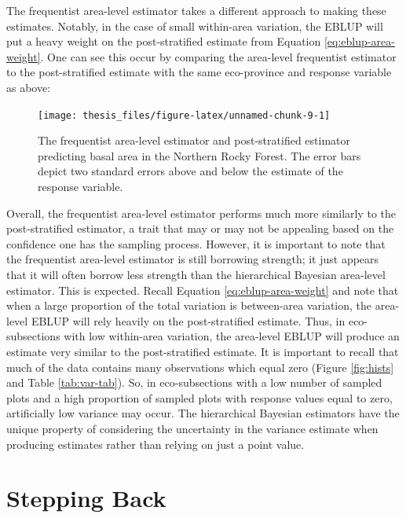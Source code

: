 \documentclass[12pt,twoside]{reedthesis}
\begin{document}
The frequentist area-level estimator takes a different approach to making these estimates. Notably, in the case of small within-area variation, the EBLUP will put a heavy weight on the post-stratified estimate from Equation \eqref{eq:eblup-area-weight}. One can see this occur by comparing the area-level frequentist estimator to the post-stratified estimate with the same eco-province and response variable as above:
\begin{figure}

{\centering \texttt{[image: thesis\_files/figure-latex/unnamed-chunk-9-1]} 

}

\caption[EBLUP area-level and Post-stratified estimates in M333]{The frequentist area-level estimator and post-stratified estimator predicting basal area in the Northern Rocky Forest. The error bars depict two standard errors above and below the estimate of the response variable.}\label{fig:unnamed-chunk-9}
\end{figure}
Overall, the frequentist area-level estimator performs much more similarly to the post-stratified estimator, a trait that may or may not be appealing based on the confidence one has the sampling process. However, it is important to note that the frequentist area-level estimator is still borrowing strength; it just appears that it will often borrow less strength than the hierarchical Bayesian area-level estimator. This is expected. Recall Equation \eqref{eq:eblup-area-weight} and note that when a large proportion of the total variation is between-area variation, the area-level EBLUP will rely heavily on the post-stratified estimate. Thus, in eco-subsections with low within-area variation, the area-level EBLUP will produce an estimate very similar to the post-stratified estimate. It is important to recall that much of the data contains many observations which equal zero (Figure \ref{fig:hists} and Table \ref{tab:var-tab}). So, in eco-subsections with a low number of sampled plots and a high proportion of sampled plots with response values equal to zero, artificially low variance may occur. The hierarchical Bayesian estimators have the unique property of considering the uncertainty in the variance estimate when producing estimates rather than relying on just a point value.
\clearpage

\hypertarget{stepping-back}{%
\section{Stepping Back}\label{stepping-back}}
\end{document}
